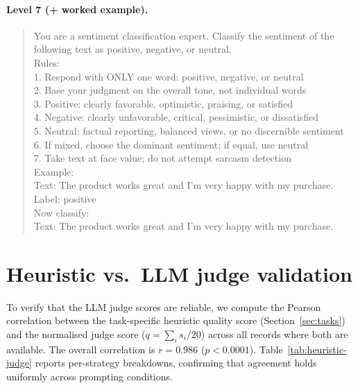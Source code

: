 \paragraph{Level 7 (+ worked example).}
\begin{quote}\small\ttfamily
You are a sentiment classification expert. Classify the sentiment of the
following text as positive, negative, or neutral.\\[4pt]
Rules:\\
1. Respond with ONLY one word: positive, negative, or neutral\\
2. Base your judgment on the overall tone, not individual words\\
3. Positive: clearly favorable, optimistic, praising, or satisfied\\
4. Negative: clearly unfavorable, critical, pessimistic, or dissatisfied\\
5. Neutral: factual reporting, balanced views, or no discernible sentiment\\
6. If mixed, choose the dominant sentiment; if equal, use neutral\\
7. Take text at face value; do not attempt sarcasm detection\\[4pt]
Example:\\
Text: The product works great and I'm very happy with my purchase.\\
Label: positive\\[4pt]
Now classify:\\
Text: The product works great and I'm very happy with my purchase.
\end{quote}

\section{Heuristic vs.\ LLM judge validation}
\label{app:validation}

To verify that the LLM judge scores are reliable, we compute the Pearson
correlation between the task-specific heuristic quality score
(Section~\ref{sec:tasks}) and the normalised judge score
($q = \sum_i s_i / 20$) across all records where both are available.
The overall correlation is $r = 0.986$ ($p < 0.0001$).
Table~\ref{tab:heuristic-judge} reports per-strategy breakdowns, confirming
that agreement holds uniformly across prompting conditions.

